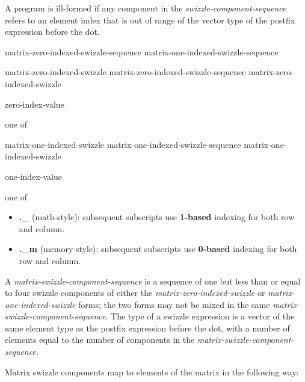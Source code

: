 \p A program is ill-formed if any component in the \textit{swizzle-component-sequence}
refers to an element index that is out of range of the vector type of the
postfix expression before the dot.

\begin{grammar}
  \br
  matrix-zero-indexed-swizzle-sequence\br
  matrix-one-indexed-swizzle-sequence\br

  \br
  matrix-zero-indexed-swizzle\br
  matrix-zero-indexed-swizzle-sequence matrix-zero-indexed-swizzle\br

  \br
   zero-index-value\br

   \textnormal{one of}\br
  \br

  \br
  matrix-one-indexed-swizzle\br
  matrix-one-indexed-swizzle-sequence matrix-one-indexed-swizzle\br

  \br
   one-index-value\br

   \textnormal{one of}\br
  \br
\end{grammar}
\begin{itemize}
\item \textbf{.\_} (math-style): subsequent subscripts use \textbf{1-based}
 indexing for both row and column.
\item \textbf{.\_m} (memory-style): subsequent subscripts use \textbf{0-based}
 indexing for both row and column.
\end{itemize}

\p A \textit{matrix-swizzle-component-sequence} is a sequence of one but less
than or equal to four swizzle components of either the
\textit{matrix-zero-indexed-swizzle} or \textit{matrix-one-indexed-swizzle}
forms; the two forms may not be mixed in the same 
\textit{matrix-swizzle-component-sequence}. The type of a swizzle expression is
a vector of the same element type as the postfix expression before the dot,
with a number of elements equal to the number of components in the
\textit{matrix-swizzle-component-sequence}.

\p Matrix swizzle components map to elements of the matrix in the following way:

